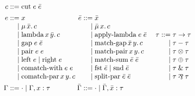 \documentclass{article}
\def\with{\mathbin{\&}}
\def\parr{\mathbin{\raisebox{-0.25ex}{\rotatebox[origin=c]{180}{\&}}}}
\begin{document}
\noindent
\[\arraycolsep=1.4pt
\begin{array}{rlrlrl}
  c ::= & \text{cut}\;e\;\bar{e}
  \vspace{1ex}\\
  e ::= & x
  &
  \bar{e}
    ::= & \bar{x}
  \\
  \mid & \mu\,\bar{x}.\,c
  &
  \mid & \bar{\mu}\,x.\,c
  \\
  \mid & \text{lambda}\,x\,\bar{y}.\,c
  &
  \mid & \text{apply-lambda}\;e\;\bar{e}
  &
  \hspace{1em}
  \tau ::= & \tau \to \tau
  \\
  \mid & \text{gap}\;e\;\bar{e}
  &
  \mid & \text{match-gap}\,\bar{x}\,y.\,c
  &
  \mid & \tau - \tau
  \\
  \mid & \text{pair}\;e\;e
  &
  \mid & \text{match-pair}\,x\,y.\,c
  &
  \mid & \tau \otimes \tau
  \\
  \mid & \text{left}\;e \mid \text{right}\;e
  &
  \mid & \text{match-sum}\;\bar{e}\;\bar{e}
  &
  \mid & \tau \oplus \tau
  \\
  \mid & \text{comatch-with}\;e\;e
  &
  \mid & \text{fst}\;\bar{e} \mid \text{snd}\;\bar{e}
  &
  \mid & \tau \with \tau
  \\
  \mid & \text{comatch-par}\,x\,y.\,c
  &
  \mid & \text{split-par}\;\bar{e}\;\bar{e}
  &
  \mid & \tau \parr \tau
  \vspace{1ex}\\
  \Gamma ::= & \cdot
          \mid \Gamma, x : \tau
  &
  \bar{\Gamma}
         ::= & \cdot
          \mid \bar{\Gamma}, \bar{x} : \tau
\end{array}
\]
\end{document}
